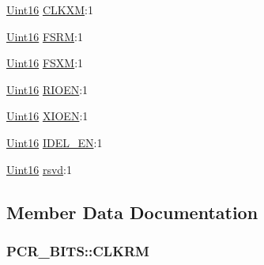 \begin{DoxyCompactItemize}
\item 
\hyperlink{_d_s_p2833x___device_8h_a59a9f6be4562c327cbfb4f7e8e18f08b}{Uint16} \hyperlink{struct_p_c_r___b_i_t_s_a02b86dfb85e6ad375a080a40fa55b6a4}{C\+L\+K\+X\+M}\+:1
\item 
\hyperlink{_d_s_p2833x___device_8h_a59a9f6be4562c327cbfb4f7e8e18f08b}{Uint16} \hyperlink{struct_p_c_r___b_i_t_s_a718892a2f17aa3745db43f8d12603570}{F\+S\+R\+M}\+:1
\item 
\hyperlink{_d_s_p2833x___device_8h_a59a9f6be4562c327cbfb4f7e8e18f08b}{Uint16} \hyperlink{struct_p_c_r___b_i_t_s_ac837ceacad598adfa4c279388db5a677}{F\+S\+X\+M}\+:1
\item 
\hyperlink{_d_s_p2833x___device_8h_a59a9f6be4562c327cbfb4f7e8e18f08b}{Uint16} \hyperlink{struct_p_c_r___b_i_t_s_a2bdda62ab7b23bb6225a838349b0a8b1}{R\+I\+O\+E\+N}\+:1
\item 
\hyperlink{_d_s_p2833x___device_8h_a59a9f6be4562c327cbfb4f7e8e18f08b}{Uint16} \hyperlink{struct_p_c_r___b_i_t_s_a0ccd23b6b79b32c68d7c4c2e341f633f}{X\+I\+O\+E\+N}\+:1
\item 
\hyperlink{_d_s_p2833x___device_8h_a59a9f6be4562c327cbfb4f7e8e18f08b}{Uint16} \hyperlink{struct_p_c_r___b_i_t_s_a8b3bb2c3ef8cd32be56374afd55e4332}{I\+D\+E\+L\+\_\+\+E\+N}\+:1
\item 
\hyperlink{_d_s_p2833x___device_8h_a59a9f6be4562c327cbfb4f7e8e18f08b}{Uint16} \hyperlink{struct_p_c_r___b_i_t_s_a095c3730557e29e25c06001c8999e69e}{rsvd}\+:1
\end{DoxyCompactItemize}


\subsection{Member Data Documentation}
\hypertarget{struct_p_c_r___b_i_t_s_a8758f73994f0b671f42e538d77c9dd54}{}
\subsubsection[{C\+L\+K\+R\+M}]{ P\+C\+R\+\_\+\+B\+I\+T\+S\+::\+C\+L\+K\+R\+M}\label{struct_p_c_r___b_i_t_s_a8758f73994f0b671f42e538d77c9dd54}
\hypertarget{struct_p_c_r___b_i_t_s_aa546e5c63a34224e556a1d936a990370}{}
